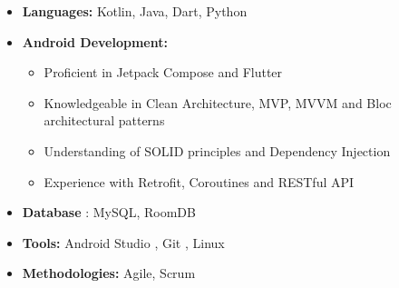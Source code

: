 \documentclass[a4paper,10pt]{article} %
\begin{document}
\begin{itemize}
    \item \textbf{Languages: }Kotlin, Java, Dart, Python
    \item \textbf{Android Development:} 
        \begin{itemize}
            \item Proficient in Jetpack Compose and Flutter
            \item Knowledgeable in Clean Architecture, MVP, MVVM and Bloc architectural patterns
            \item Understanding of SOLID principles and Dependency Injection
            \item Experience with Retrofit, Coroutines and RESTful API 
        \end{itemize}
    \item \textbf{Database} : MySQL, RoomDB
    \item \textbf{Tools: }Android Studio , Git , Linux
    \item \textbf{Methodologies: }Agile, Scrum
\end{itemize}
\end{document}
